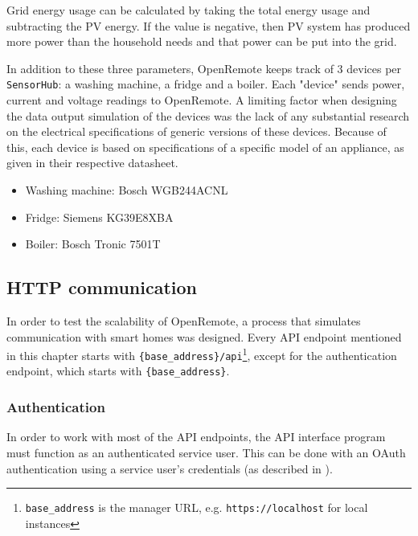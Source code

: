 Grid energy usage can be calculated by taking the total energy usage and subtracting the PV energy. If the value is negative, then PV system has produced more power than the household needs and that power can be put into the grid.


In addition to these three parameters, OpenRemote keeps track of 3 devices per \lstinline|SensorHub|: a washing machine, a fridge and a boiler. Each "device" sends power, current and voltage readings to OpenRemote. A limiting factor when designing the data output simulation of the devices was the lack of any substantial research on the electrical specifications of generic versions of these devices. Because of this, each device is based on specifications of a specific model of an appliance, as given in their respective datasheet. 
\begin{itemize}
    \item Washing machine: Bosch WGB244ACNL
    \item Fridge: Siemens KG39E8XBA
    \item Boiler: Bosch Tronic 7501T
\end{itemize}

\subsection{HTTP communication} \label{http_com}
In order to test the scalability of OpenRemote, a process that simulates communication with smart homes was designed. Every API endpoint mentioned in this chapter starts with \lstinline|{base_address}/api|\footnote{\lstinline|base_address| is the manager URL, e.g. \lstinline|https://localhost| for local instances}, except for the authentication endpoint, which starts with \lstinline|{base_address}|.



\subsubsection{Authentication}\label{auth_chap}
In order to work with most of the API endpoints, the API interface program must function as an authenticated service user. This can be done with an OAuth authentication using a service user's credentials (as described in \cite{auth-setup}). 

